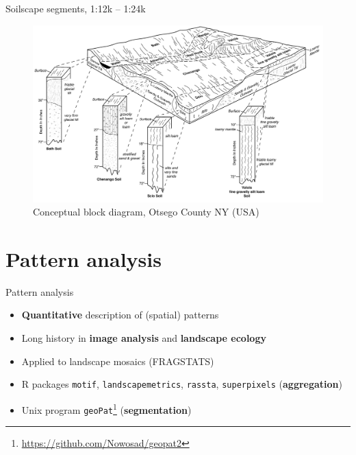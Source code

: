 \documentclass[aspectratio=169, 10pt]{beamer}
\begin{document}
\begin{frame}{Soilscape segments, 1:12k -- 1:24k}
    \begin{figure}
        \centering
\includegraphics[height=0.65\textheight]{./graphics_david/NY-2010-09-28-14.pdf}\\
{Conceptual block diagram, Otsego County NY (USA)}
     \end{figure}
\end{frame}


\section{Pattern analysis}

\begin{frame}{Pattern analysis}
    \begin{itemize}
        \item \textbf{Quantitative} description of (spatial) patterns
        \item Long history in \textbf{image analysis} and \textbf{landscape ecology}
        \item Applied to landscape mosaics (FRAGSTATS)
        \item R packages  \texttt{motif}, \texttt{landscapemetrics}, \texttt{rassta}, \texttt{superpixels} (\textbf{aggregation})
        \item Unix program \texttt{geoPat}\footnote{\url{https://github.com/Nowosad/geopat2}} (\textbf{segmentation})
   \end{itemize}
\end{frame}
\end{document}
